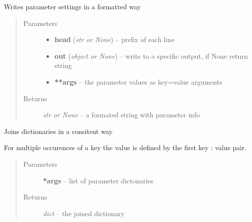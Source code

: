 \documentclass[letterpaper,10pt,english]{sphinxmanual}
\begin{document}

\begin{fulllineitems}
\label{api/ClearMap.Utils:ClearMap.Utils.ParameterTools.writeParameter}
Writes parameter settings in a formatted way
\begin{quote}\begin{description}
\item[{Parameters}] \leavevmode\begin{itemize}
\item {} 
\textbf{head} (\emph{str or None}) --
prefix of each line

\item {} 
\textbf{out} (\emph{object or None}) --
write to a specific output, if None return string

\item {} 
\textbf{**args} --
the parameter values as key=value arguments

\end{itemize}

\item[{Returns}] \leavevmode
\emph{str or None} --
a formated string with parameter info

\end{description}\end{quote}

\end{fulllineitems}


\begin{fulllineitems}
\label{api/ClearMap.Utils:ClearMap.Utils.ParameterTools.joinParameter}
Joins dictionaries in a consitent way

For multiple occurences of a key the  value is defined by the first key : value pair.
\begin{quote}\begin{description}
\item[{Parameters}] \leavevmode
\textbf{*args} --
list of parameter dictonaries

\item[{Returns}] \leavevmode
\emph{dict} --
the joined dictionary

\end{description}\end{quote}

\end{fulllineitems}
\end{document}
